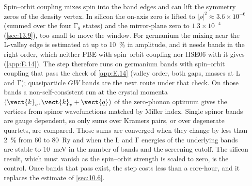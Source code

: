 Spin--orbit coupling mixes spin into the band edges and can lift the symmetry zeros of the density vertex. In silicon the on-axis zero is lifted to $|\rho|^2 \approx 3.6\times10^{-6}$ (summed over the four $\mathrm{\Gamma}_8$ states) and the mirror-plane zero to $1.3\times10^{-4}$ (\cref{sec:13.9}), too small to move the window. For germanium the mixing near the L-valley edge is estimated at up to \SI{10}{\percent} in amplitude, and it needs bands in the right order, which neither PBE with spin--orbit coupling nor HSE06 with it gives (\cref{app:E.14}). The step therefore runs on germanium bands with spin--orbit coupling that pass the check of \cref{app:E.14} (valley order, both gaps, masses at L and $\mathrm{\Gamma}$); quasiparticle $GW$ bands are the next route under that check. On those bands a non-self-consistent run at the crystal momenta $(\vect{k}_v, \vect{k}_v+\vect{q})$ of the zero-phonon optimum gives the vertices from spinor wavefunctions matched by Miller index. Single spinor bands are gauge dependent, so only sums over Kramers pairs, or over degenerate quartets, are compared. Those sums are converged when they change by less than \SI{2}{\percent} from 60 to \SI{80}{Ry} and when the L and $\mathrm{\Gamma}$ energies of the underlying bands are stable to \SI{10}{meV} in the number of bands and the screening cutoff. The silicon result, which must vanish as the spin--orbit strength is scaled to zero, is the control. Once bands that pass exist, the step costs less than a core-hour, and it replaces the estimate of \cref{sec:10.6}.
